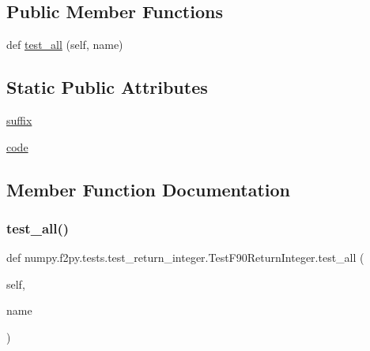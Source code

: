 \subsection*{Public Member Functions}
\begin{DoxyCompactItemize}
\item 
def \hyperlink{classnumpy_1_1f2py_1_1tests_1_1test__return__integer_1_1TestF90ReturnInteger_a5e846f0c3dc28992af9ba503150c0001}{test\+\_\+all} (self, name)
\end{DoxyCompactItemize}
\subsection*{Static Public Attributes}
\begin{DoxyCompactItemize}
\item 
\hyperlink{classnumpy_1_1f2py_1_1tests_1_1test__return__integer_1_1TestF90ReturnInteger_a816b0b13c782f630f9391d15e7212a94}{suffix}
\item 
\hyperlink{classnumpy_1_1f2py_1_1tests_1_1test__return__integer_1_1TestF90ReturnInteger_a02ef7df7e34017a5b02ae411905ffcb3}{code}
\end{DoxyCompactItemize}


\subsection{Member Function Documentation}
\mbox{\label{classnumpy_1_1f2py_1_1tests_1_1test__return__integer_1_1TestF90ReturnInteger_a5e846f0c3dc28992af9ba503150c0001}} 
\subsubsection{\texorpdfstring{test\+\_\+all()}{test\_all()}}
{\footnotesize\ttfamily def numpy.\+f2py.\+tests.\+test\+\_\+return\+\_\+integer.\+Test\+F90\+Return\+Integer.\+test\+\_\+all (\begin{DoxyParamCaption}\item[{}]{self,  }\item[{}]{name }\end{DoxyParamCaption})}



